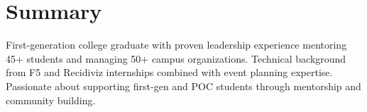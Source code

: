 \section{Summary}
    First-generation college graduate with proven leadership experience mentoring 45+ students and managing 50+ campus organizations. Technical background from F5 and Recidiviz internships combined with event planning expertise. Passionate about supporting first-gen and POC students through mentorship and community building.